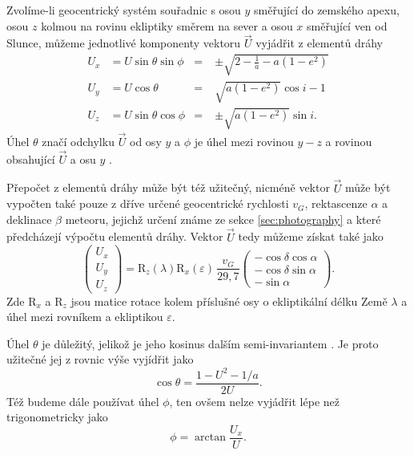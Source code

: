 Zvolíme-li geocentrický systém souřadnic s osou $y$ směřující do zemského apexu, osou $z$ kolmou na rovinu ekliptiky směrem na sever a osou $x$ směřující ven od Slunce, můžeme jednotlivé komponenty vektoru $\vec{U}$ vyjádřit z elementů dráhy \cite{newapproach}
\begin{equation}
    \begin{aligned}
        U_x & = U\sin{\theta}\sin{\phi} & =\; & \pm\sqrt{2-\frac{1}{a}-a(1-e^2)}  \\
        U_y & = U\cos{\theta}           & =\; & \sqrt{a(1-e^2)}\cos{i}-1          \\
        U_z & = U\sin{\theta}\cos{\phi} & =\; & \pm\sqrt{a(1-e^2)}\sin{i}\text{.}
    \end{aligned}
    \label{eqn:geocentric:u}
\end{equation}
Úhel $\theta$ značí odchylku $\vec{U}$ od osy $y$ a $\phi$ je úhel mezi rovinou $y\!-\!z$ a rovinou obsahující $\vec{U}$ a osu $y$ \cite{newapproach}.

Přepočet z elementů dráhy může být též užitečný, nicméně vektor $\vec{U}$ může být vypočten také pouze z dříve určené geocentrické rychlosti $v_G$, rektascenze $\alpha$ a deklinace $\beta$ meteoru, jejichž určení známe ze sekce \ref{sec:photography} a které předcházejí výpočtu elementů dráhy. Vektor $\vec{U}$ tedy můžeme získat také jako \cite{newapproach}
\begin{equation}
    \begin{pmatrix}
        U_x\\U_y\\U_z
    \end{pmatrix}=\text{R}_z(\lambda)\text{R}_x(\varepsilon)\,\frac{v_G}{29{,}7}\begin{pmatrix}
        -\cos{\delta}\cos{\alpha}\\
        -\cos{\delta}\sin{\alpha}\\
        -\sin{\alpha}
    \end{pmatrix}\text{.}
\end{equation}
Zde $\text{R}_x$ a $\text{R}_z$ jsou matice rotace kolem příslušné osy o ekliptikální délku Země $\lambda$ a úhel mezi rovníkem a ekliptikou $\varepsilon$.

\medskip

Úhel $\theta$ je důležitý, jelikož je jeho kosinus dalším semi-invariantem \cite{newapproach}. Je proto užitečné jej z rovnic výše vyjídřit jako \cite{newapproach}
\begin{equation}
    \cos{\theta}=\frac{1-U^2-1/a}{2U}\text{.}
\end{equation}
Též budeme dále používat úhel $\phi$, ten ovšem nelze vyjádřit lépe než trigonometricky jako \cite{newapproach}
\begin{equation}
    \phi=\arctan{\frac{U_x}{U}}\text{.}
\end{equation}

